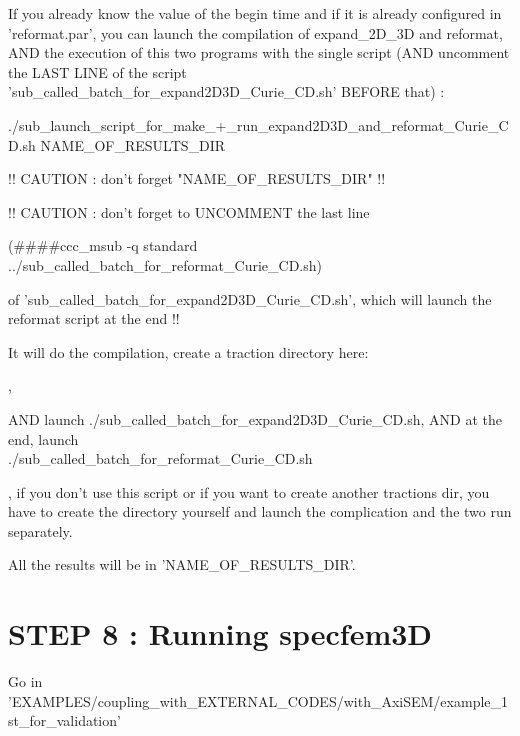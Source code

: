 \documentclass[11pt]{article}
\begin{document}
\bigskip

 If you already know the value of the begin time and if it is already configured in 'reformat.par', you can launch the compilation of expand\_2D\_3D and reformat, AND the execution of this two programs with the single script (AND uncomment the LAST LINE of the script 'sub\_called\_batch\_for\_expand2D3D\_Curie\_CD.sh' BEFORE that) :

\medskip

\noindent ./sub\_launch\_script\_for\_make\_+\_run\_expand2D3D\_and\_reformat\_Curie\_CD.sh NAME\_OF\_RESULTS\_DIR

\medskip

\noindent !! CAUTION : don't forget "NAME\_OF\_RESULTS\_DIR" !!

\medskip

\noindent !! CAUTION : don't forget to UNCOMMENT the last line

\noindent (\#\#\#\#ccc\_msub -q standard ../sub\_called\_batch\_for\_reformat\_Curie\_CD.sh)

\noindent of 'sub\_called\_batch\_for\_expand2D3D\_Curie\_CD.sh', which will launch the reformat script at the end !!

\bigskip

\noindent It will do the compilation, create a traction directory here:

,

\smallskip

\noindent AND launch ./sub\_called\_batch\_for\_expand2D3D\_Curie\_CD.sh, AND at the end, launch \\
\noindent ./sub\_called\_batch\_for\_reformat\_Curie\_CD.sh

\medskip

, if you don't use this script or if you want to create another tractions dir, you have to create the directory yourself and launch the complication and the two run separately.

\bigskip

\noindent All the results will be in 'NAME\_OF\_RESULTS\_DIR'.


\section{STEP 8 : Running specfem3D}

\noindent Go in 'EXAMPLES/coupling\_with\_EXTERNAL\_CODES/with\_AxiSEM/example\_1st\_for\_validation'
\end{document}
